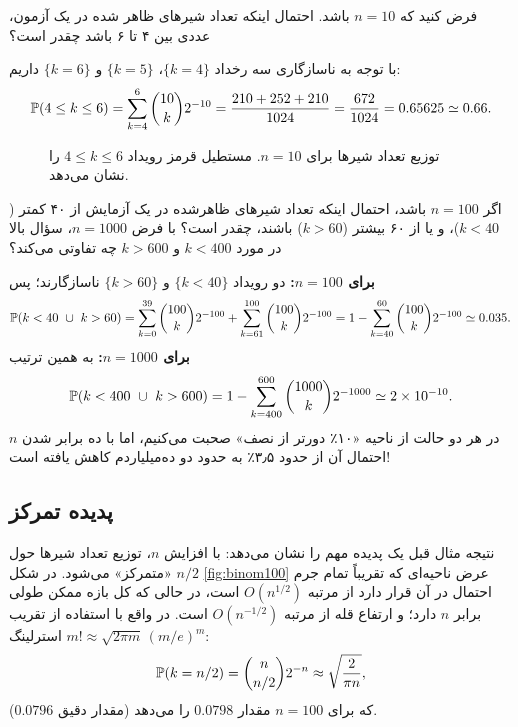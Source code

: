 \begin{example}
فرض کنید که $n=10$ باشد. احتمال اینکه تعداد شیرهای ظاهر شده در یک آزمون، عددی بین ۴ تا ۶ باشد چقدر است؟
\begin{solution}
با توجه به ناسازگاری سه رخداد $\{k=4\}$، $\{k=5\}$ و $\{k=6\}$ داریم:
\[
\mathbb{P}(4\le k\le 6)=\sum_{k=4}^{6}\binom{10}{k}2^{-10}=\frac{210+252+210}{1024}=\frac{672}{1024}=0.65625\simeq0.66 .
\]
\end{solution}
\end{example}

\begin{figure}[H]
\centering
{}
\caption{توزیع تعداد شیرها برای $n=10$. مستطیل قرمز رویداد $4\le k\le 6$ را نشان می‌دهد.}
\end{figure}

\begin{example}
اگر $n=100$ باشد، احتمال اینکه تعداد شیرهای ظاهرشده در یک آزمایش از ۴۰ کمتر ($k<40$)، و یا از ۶۰ بیشتر ($k>60$) باشند، چقدر است؟ با فرض $n=1000$، سؤال بالا در مورد $k<400$ و $k>600$ چه تفاوتی می‌کند؟
\begin{solution}
\textbf{برای $n=100$:} دو رویداد $\{k<40\}$ و $\{k>60\}$ ناسازگارند؛ پس
\[
\Prob(k<40\ \cup\ k>60)=\sum_{k=0}^{39}\binom{100}{k}2^{-100}+\sum_{k=61}^{100}\binom{100}{k}2^{-100}
=1-\sum_{k=40}^{60}\binom{100}{k}2^{-100}\simeq0.035 .
\]
\textbf{برای $n=1000$:} به همین ترتیب
\[
\Prob(k<400\ \cup\ k>600)=1-\sum_{k=400}^{600}\binom{1000}{k}2^{-1000}\simeq 2\times10^{-10}.
\]
در هر دو حالت از ناحیه «۱۰٪ دورتر از نصف» صحبت می‌کنیم، اما با ده برابر شدن $n$ احتمال آن از حدود ۳٫۵٪ به حدود دو ده‌میلیاردم کاهش یافته است!
\end{solution}
\end{example}

\subsection{پدیده تمرکز}
نتیجه مثال قبل یک پدیده مهم را نشان می‌دهد: با افزایش $n$، توزیع تعداد شیرها حول $n/2$ «متمرکز» می‌شود. در شکل \ref{fig:binom100} عرض ناحیه‌ای که تقریباً تمام جرم احتمال در آن قرار دارد از مرتبه $O(n^{1/2})$ است، در حالی که کل بازه ممکن طولی برابر $n$ دارد؛ و ارتفاع قله از مرتبه $O(n^{-1/2})$ است. در واقع با استفاده از تقریب استرلینگ $m!\approx\sqrt{2\pi m}\,(m/e)^m$:
\[
\mathbb{P}(k=n/2)=\binom{n}{n/2}2^{-n}\approx\sqrt{\frac{2}{\pi n}},
\]
که برای $n=100$ مقدار $0.0798$ را می‌دهد (مقدار دقیق $0.0796$).

